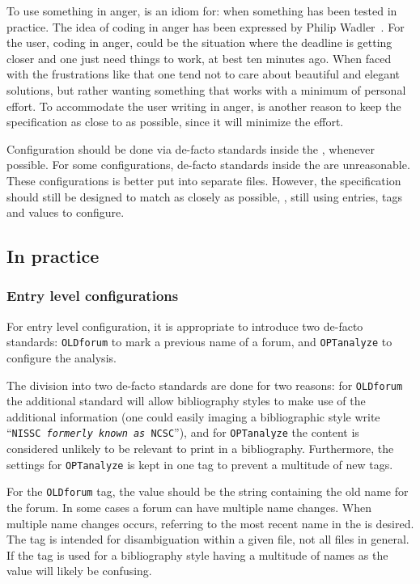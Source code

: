 To use something in anger, is an idiom for: when something has been
tested in practice.  The idea of coding in anger has been expressed by
Philip Wadler~\cite{wadler1997_functional}.  For the {\bibtex} user,
coding in anger, could be the situation where the deadline is getting
closer and one just need things to work, at best ten minutes ago.
When faced with the frustrations like that one tend not to care about
beautiful and elegant solutions, but rather wanting something that
works with a minimum of personal effort.  To accommodate the user
writing {\bibtex} in anger, is another reason to keep the
specification as close to {\bibtex} as possible, since it will
minimize the effort.

Configuration should be done via de-facto standards inside the
, whenever possible.  For some configurations, de-facto
standards inside the  are unreasonable.  These
configurations is better put into separate files.  However, the
specification should still be designed to match {\bibtex} as closely
as possible, \ie, still using entries, tags and values to configure.


\subsection{In practice}
\label{sec:analyzing_in_practice}

\subsubsection{Entry level configurations}

For entry level configuration, it is appropriate to introduce two
de-facto standards: \texttt{OLDforum} to mark a previous name of a
forum, and \texttt{OPTanalyze} to configure the analysis.

The division into two de-facto standards are done for two reasons: for
\texttt{OLDforum} the additional standard will allow bibliography
styles to make use of the additional information (one could easily
imaging a bibliographic style write ``\texttt{NISSC \textit{formerly
    known as} NCSC}''), and for \texttt{OPTanalyze} the content is
considered unlikely to be relevant to print in a bibliography.
Furthermore, the settings for \texttt{OPTanalyze} is kept in one tag
to prevent a multitude of new tags.


For the \texttt{OLDforum} tag, the value should be the string
containing the old name for the forum.  In some cases a forum can have
multiple name changes.  When multiple name changes occurs, referring
to the most recent name in the  is desired.  The tag is
intended for disambiguation within a given file, not all files in
general.  If the tag is used for a bibliography style having a
multitude of names as the value will likely be confusing.

